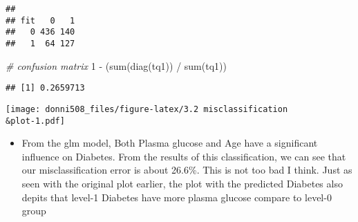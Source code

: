 \documentclass[
]{article}
\newenvironment{Shaded}{\begin{snugshade}}{\end{snugshade}}
\newcommand{\AttributeTok}[1]{\textcolor[rgb]{0.77,0.63,0.00}{#1}}
\newcommand{\CommentTok}[1]{\textcolor[rgb]{0.56,0.35,0.01}{\textit{#1}}}
\newcommand{\DecValTok}[1]{\textcolor[rgb]{0.00,0.00,0.81}{#1}}
\newcommand{\FunctionTok}[1]{\textcolor[rgb]{0.00,0.00,0.00}{#1}}
\newcommand{\NormalTok}[1]{#1}
\newcommand{\OtherTok}[1]{\textcolor[rgb]{0.56,0.35,0.01}{#1}}
\newcommand{\SpecialCharTok}[1]{\textcolor[rgb]{0.00,0.00,0.00}{#1}}
\newcommand{\StringTok}[1]{\textcolor[rgb]{0.31,0.60,0.02}{#1}}
\providecommand{\tightlist}{%
  \setlength{\itemsep}{0pt}\setlength{\parskip}{0pt}}
\begin{document}
\begin{Shaded}
\end{Shaded}

\begin{verbatim}
##    
## fit   0   1
##   0 436 140
##   1  64 127
\end{verbatim}

\begin{Shaded}
\begin{Highlighting}[]
\CommentTok{\# confusion matrix}
\DecValTok{1} \SpecialCharTok{{-}}\NormalTok{ (}\FunctionTok{sum}\NormalTok{(}\FunctionTok{diag}\NormalTok{(tq1)) }\SpecialCharTok{/} \FunctionTok{sum}\NormalTok{(tq1))}
\end{Highlighting}
\end{Shaded}

\begin{verbatim}
## [1] 0.2659713
\end{verbatim}

\begin{Shaded}
\end{Shaded}

\texttt{[image: donni508\_files/figure-latex/3.2 misclassification\\\&plot-1.pdf]}

\begin{itemize}
\tightlist
\item
  From the glm model, Both Plasma glucose and Age have a significant
  influence on Diabetes. From the results of this classification, we can
  see that our misclassification error is about 26.6\%. This is not too
  bad I think. Just as seen with the original plot earlier, the plot
  with the predicted Diabetes also depits that level-1 Diabetes have
  more plasma glucose compare to level-0 group
\end{itemize}
\end{document}
